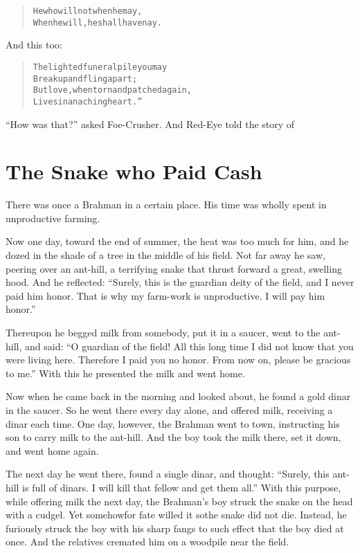 \documentclass[article, twoside, 14pt]{memoir}
\renewenvironment{verbatim}{%
\begin{quote}%
\vskip -10pt%
\begin{alltt}\normalfont\large}{\end{alltt}%
\end{quote}%
\vskip -10pt
} %
\begin{document}
\begin{verbatim}
He who will not when he may,
When he will, he shall have nay.
\end{verbatim}
And this too:

\begin{verbatim}
The lighted funeral pile you may
    Break up and fling apart;
But love, when torn and patched again,
    Lives in an aching heart.”
\end{verbatim}
``How was that?'' asked Foe-Crusher. And Red-Eye told the story of

\chapter{The Snake who Paid Cash}

\label{s53}

There was once a Brahman in a certain place. His time was wholly
spent in unproductive farming.

Now one day, toward the end of summer, the heat was too much for
him, and he dozed in the shade of a tree in the middle of his
field. Not far away he saw, peering over an ant-hill, a terrifying
snake that thrust forward a great, swelling hood. And he reflected:
``Surely, this is the guardian deity of the field, and I never paid him honor. That is why my farm-work is unproductive. I will pay him honor.''

Thereupon he begged milk from somebody, put it in a saucer, went to
the ant-hill, and said:
``O guardian of the field! All this long time I did not know that you were living here. Therefore I paid you no honor. From now on, please be gracious to me.''
With this he presented the milk and went home.

Now when he came back in the morning and looked about, he found a
gold dinar in the saucer. So he went there every day alone,
and offered milk, receiving a dinar each time. One day, however,
the Brahman went to town, instructing his son to carry milk to the
ant-hill. And the boy took the milk there, set it down, and went
home again.

The next day he went there, found a single dinar, and thought:
``Surely, this ant-hill is full of dinars. I will kill that fellow and get them all.''
With this purpose, while offering milk the next day, the Brahman's
boy struck the snake on the head with a cudgel. Yet somehow{\textemdash}for
fate willed it so{\textemdash}the snake did not die. Instead, he furiously
struck the boy with his sharp fangs to such effect that the boy
died at once. And the relatives cremated him on a woodpile near the
field.
\end{document}
